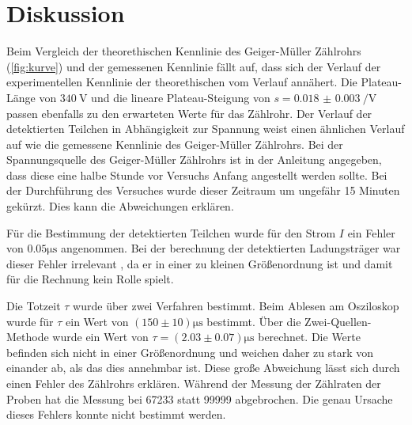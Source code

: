 \section{Diskussion}
\label{sec:diskussion}

Beim Vergleich der theorethischen Kennlinie des Geiger-Müller Zählrohrs (\autoref{fig:kurve}) und der gemessenen Kennlinie
fällt auf, dass sich der Verlauf der experimentellen Kennlinie der theorethischen vom Verlauf annähert.
Die Plateau-Länge von $\SI{340}{\volt}$ und die lineare Plateau-Steigung von $ s= \qty{0.018(3)}{\per\volt}$ passen ebenfalls
zu den erwarteten Werte für das Zählrohr. Der Verlauf der detektierten Teilchen in Abhängigkeit zur Spannung 
weist einen ähnlichen Verlauf auf wie die gemessene Kennlinie des Geiger-Müller Zählrohrs.
Bei der Spannungsquelle des Geiger-Müller Zählrohrs ist in der Anleitung angegeben, dass diese eine halbe Stunde
vor Versuchs Anfang angestellt werden sollte. Bei der Durchführung des Versuches wurde dieser Zeitraum um ungefähr 15 Minuten 
gekürzt. Dies kann die Abweichungen erklären.

Für die Bestimmung der detektierten Teilchen wurde für den Strom $I$ ein Fehler von $0.05 \si{\micro\second}$ angenommen.
Bei der berechnung der detektierten Ladungsträger war dieser Fehler irrelevant , da er in einer zu kleinen Größenordnung ist und 
damit für die Rechnung kein Rolle spielt.

Die Totzeit $\tau$ wurde über zwei Verfahren bestimmt. Beim Ablesen am Osziloskop wurde für $\tau$ ein Wert von
$\left(150 \pm  10\right) \si{\micro\second}$ bestimmt. Über die Zwei-Quellen-Methode wurde ein Wert von $\tau =\left(2.03 \pm 0.07\right) \si{\micro\second}$
berechnet. Die Werte befinden sich nicht in einer Größenordnung und weichen daher zu stark von einander ab, als das dies annehmbar ist.
Diese große Abweichung lässt sich durch einen Fehler des Zählrohrs erklären. Während der Messung der Zählraten der Proben
hat die Messung bei 67233 statt 99999 abgebrochen. Die genau Ursache dieses Fehlers konnte nicht bestimmt werden.

\newpage
